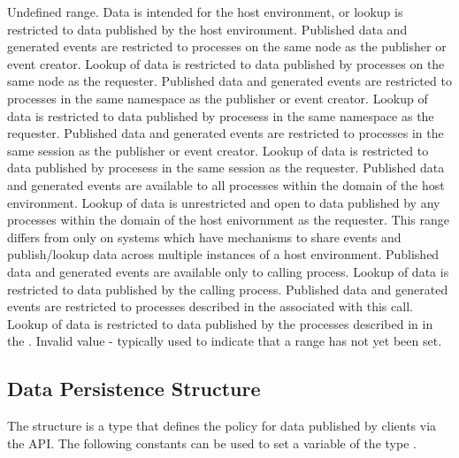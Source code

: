 \begin{constantdesc}
%
Undefined range.
%
Data is intended for the host environment, or lookup is restricted to data published by the host environment.
%
Published data and generated events are restricted to processes on the same node as the publisher or event creator.  Lookup of data is restricted to data published by processes on the same node as the requester.
%
Published data and generated events are restricted to processes in the same namespace as the publisher or event creator.
Lookup of data is restricted to data published by procesess in the same namespace as the requester.
%
Published data and generated events are restricted to processes in the same session as the publisher or event creator.
Lookup of data is restricted to data published by procesess in the same session as the requester.
%
Published data and generated events are available to all processes within the domain of the host environment.
Lookup of data is unrestricted and open to data published by any processes within the domain of the host enivornment as the requester.  This range differs from  only on systems which have mechanisms to share events and
publish/lookup data across multiple instances of a host environment.
%
Published data and generated events are available only to calling process.
Lookup of data is restricted to data published by the calling process.
%
Published data and generated events are restricted to processes
described in the  associated with this call.
Lookup of data is restricted to data published by the processes described in
in the .
%
Invalid value - typically used to indicate that a range has not yet been set.
%
\end{constantdesc}


\subsection{Data Persistence Structure}

The  structure is a  type that defines the policy for data published by clients via the  \ac{API}.
The following constants can be used to set a variable of the type .

